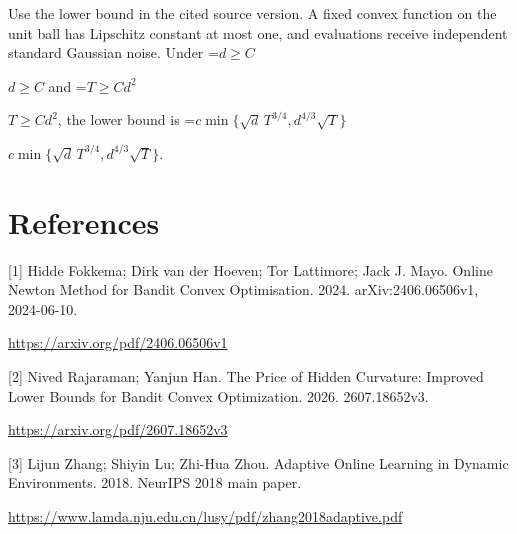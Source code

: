 \documentclass[10pt,a4paper]{article}
\newcommand{\AtlasMath}[1]{\par\begingroup\centering\setbox0=\hbox{$\displaystyle #1$}\ifdim\wd0>1.4\linewidth\typeout{ATLAS WIDE FORMULA: \the\wd0}\fi\ifdim\wd0>\linewidth\resizebox{\linewidth}{!}{\box0}\else\box0\fi\par\endgroup}
\newcommand{\AtlasInlineMath}[1]{\begingroup\setbox0=\hbox{$#1$}\ifdim\wd0>.4\linewidth\endgroup\AtlasMath{#1}\else\endgroup$#1$\fi}
\begin{document}
Use the lower bound in the cited source version. A fixed convex function on the unit ball has Lipschitz constant at most one, and evaluations receive independent standard Gaussian noise. Under \AtlasInlineMath{d\ge C} and \AtlasInlineMath{T\ge Cd^2}, the lower bound is \AtlasInlineMath{c\min\{\sqrt d\,T^{3/4},d^{4/3}\sqrt T\}}.

\section{References}
[1] Hidde Fokkema; Dirk van der Hoeven; Tor Lattimore; Jack J. Mayo. Online Newton Method for Bandit Convex Optimisation. 2024. arXiv:2406.06506v1, 2024-06-10.

\url{https://arxiv.org/pdf/2406.06506v1}

[2] Nived Rajaraman; Yanjun Han. The Price of Hidden Curvature: Improved Lower Bounds for Bandit Convex Optimization. 2026. 2607.18652v3.

\url{https://arxiv.org/pdf/2607.18652v3}

[3] Lijun Zhang; Shiyin Lu; Zhi-Hua Zhou. Adaptive Online Learning in Dynamic Environments. 2018. NeurIPS 2018 main paper.

\url{https://www.lamda.nju.edu.cn/lusy/pdf/zhang2018adaptive.pdf}
\end{document}
